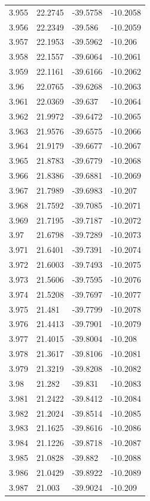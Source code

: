 \begin{tabular}{llll}
3.955 & 22.2745 & -39.5758 & -10.2058 \\
3.956 & 22.2349 & -39.586 & -10.2059 \\
3.957 & 22.1953 & -39.5962 & -10.206 \\
3.958 & 22.1557 & -39.6064 & -10.2061 \\
3.959 & 22.1161 & -39.6166 & -10.2062 \\
3.96 & 22.0765 & -39.6268 & -10.2063 \\
3.961 & 22.0369 & -39.637 & -10.2064 \\
3.962 & 21.9972 & -39.6472 & -10.2065 \\
3.963 & 21.9576 & -39.6575 & -10.2066 \\
3.964 & 21.9179 & -39.6677 & -10.2067 \\
3.965 & 21.8783 & -39.6779 & -10.2068 \\
3.966 & 21.8386 & -39.6881 & -10.2069 \\
3.967 & 21.7989 & -39.6983 & -10.207 \\
3.968 & 21.7592 & -39.7085 & -10.2071 \\
3.969 & 21.7195 & -39.7187 & -10.2072 \\
3.97 & 21.6798 & -39.7289 & -10.2073 \\
3.971 & 21.6401 & -39.7391 & -10.2074 \\
3.972 & 21.6003 & -39.7493 & -10.2075 \\
3.973 & 21.5606 & -39.7595 & -10.2076 \\
3.974 & 21.5208 & -39.7697 & -10.2077 \\
3.975 & 21.481 & -39.7799 & -10.2078 \\
3.976 & 21.4413 & -39.7901 & -10.2079 \\
3.977 & 21.4015 & -39.8004 & -10.208 \\
3.978 & 21.3617 & -39.8106 & -10.2081 \\
3.979 & 21.3219 & -39.8208 & -10.2082 \\
3.98 & 21.282 & -39.831 & -10.2083 \\
3.981 & 21.2422 & -39.8412 & -10.2084 \\
3.982 & 21.2024 & -39.8514 & -10.2085 \\
3.983 & 21.1625 & -39.8616 & -10.2086 \\
3.984 & 21.1226 & -39.8718 & -10.2087 \\
3.985 & 21.0828 & -39.882 & -10.2088 \\
3.986 & 21.0429 & -39.8922 & -10.2089 \\
3.987 & 21.003 & -39.9024 & -10.209 \\

\end{tabular}
